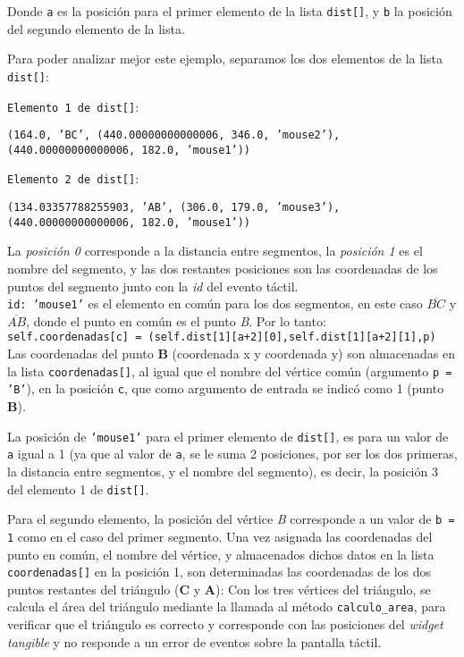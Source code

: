 Donde \texttt{a} es la posición para el primer elemento de la lista \texttt{dist[]}, y \texttt{b} la posición del segundo elemento de la lista.

Para poder analizar mejor este ejemplo, separamos los dos elementos de la lista \texttt{dist[]}:

\texttt{Elemento 1 de dist[]}:

\texttt{(164.0, 'BC', (440.00000000000006, 346.0, 'mouse2'), (440.00000000000006, 182.0, 'mouse1'))}

\texttt{Elemento 2 de dist[]}:

\texttt{(134.03357788255903, 'AB', (306.0, 179.0, 'mouse3'), (440.00000000000006, 182.0, 'mouse1'))}

La \textit{posición 0} corresponde a la distancia entre segmentos, la \textit{posición 1} es el nombre del segmento, y las dos restantes posiciones son las coordenadas de los puntos del segmento junto con la \textit{id} del evento táctil.\\

\texttt{id: 'mouse1'} es el elemento en común para los dos segmentos, en este caso $\overline{BC}$ y $\overline{AB}$, donde el punto en común es el punto \textit{B}. Por lo tanto:\\

\texttt{self.coordenadas[c] = (self.dist[1][a+2][0],self.dist[1][a+2][1],p)}\\

Las coordenadas del punto \textbf{B} (coordenada x y coordenada y) son almacenadas en la lista \texttt{coordenadas[]}, al igual que el nombre del vértice común (argumento \texttt{p = 'B'}), en la posición \texttt{c}, que como argumento de entrada se indicó como 1 (punto \textbf{B}). 

La posición de \texttt{'mouse1'} para el primer elemento de \texttt{dist[]}, es para un valor de \texttt{a} igual a 1 (ya que al valor de \texttt{a}, se le suma 2 posiciones, por ser los dos primeras, la distancia entre segmentos, y el nombre del segmento), es decir, la posición 3 del elemento 1 de \texttt{dist[]}.

Para el segundo elemento, la posición del vértice \textit{B} corresponde a un valor de \texttt{b = 1} como en el caso del primer segmento.
Una vez asignada las coordenadas del punto en común, el nombre del vértice, y almacenados dichos datos en la lista \texttt{coordenadas[]} en la posición 1, son determinadas las coordenadas de los dos puntos restantes del triángulo (\textbf{C} y \textbf{A}): 
Con los tres vértices del triángulo, se calcula el área del triángulo mediante la llamada al método \texttt{calculo\_area}, para verificar que el triángulo es correcto y corresponde con las posiciones del \emph{widget tangible} y no responde a un error de eventos sobre la pantalla táctil.

